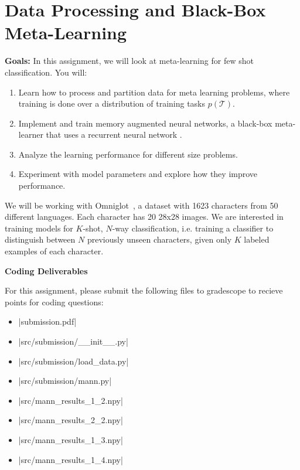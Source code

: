 \section*{Data Processing and Black-Box Meta-Learning}

\textbf{Goals:} In this assignment, we will look at meta-learning for few shot classification. You will:
\begin{enumerate}
    \item Learn how to process and partition data for meta learning problems, where training is done over a distribution of training tasks $p(\mathcal{T})$.
    \item Implement and train memory augmented neural networks, a black-box meta-learner that uses a recurrent neural network \cite{pmlr-v48-santoro16}.
    \item Analyze the learning performance for different size problems.
    \item Experiment with model parameters and explore how they improve performance.
\end{enumerate}

We will be working with Omniglot~\cite{Lake1332}, a dataset with 1623 characters from 50 different languages. Each character has 20 28x28 images.
We are interested in training models for $K$-shot, $N$-way classification, i.e. training a classifier to distinguish between $N$ previously unseen characters, given only $K$ labeled examples of each character.

\textbf{Coding Deliverables}

For this assignment, please submit the following files to gradescope to recieve points for coding questions:
\begin{itemize}
    \item |submission.pdf|
    \item |src/submission/__init__.py|
    \item |src/submission/load_data.py|
    \item |src/submission/mann.py|
    \item |src/mann_results_1_2.npy|
    \item |src/mann_results_2_2.npy|
    \item |src/mann_results_1_3.npy|
    \item |src/mann_results_1_4.npy|
\end{itemize}

\clearpage

\begin{enumerate}
	
    
    
    
\end{enumerate}


\clearpage